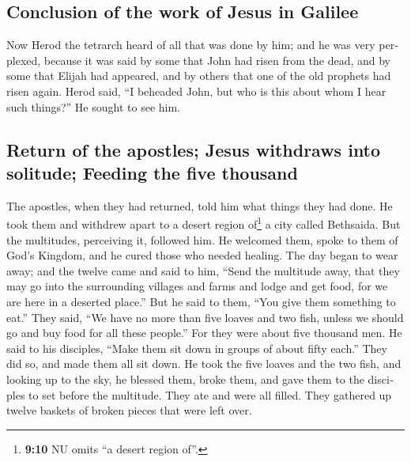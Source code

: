\begin{paracol}{2}
\begin{otherlanguage}{english}
\hypertarget{conclusion-of-the-work-of-jesus-in-galilee}{%
\subsection{Conclusion of the work of Jesus in
Galilee}\label{conclusion-of-the-work-of-jesus-in-galilee}}

 Now Herod the tetrarch heard of all that was done by him;
and he was very perplexed, because it was said by some that John had
risen from the dead,  and by some that Elijah had
appeared, and by others that one of the old prophets had risen again.
 Herod said, ``I beheaded John, but who is this about whom
I hear such things?'' He sought to see him.

\hypertarget{return-of-the-apostles-jesus-withdraws-into-solitude-feeding-the-five-thousand}{%
\subsection{Return of the apostles; Jesus withdraws into solitude;
Feeding the five
thousand}\label{return-of-the-apostles-jesus-withdraws-into-solitude-feeding-the-five-thousand}}

 The apostles, when they had returned, told him what
things they had done. He took them and withdrew apart to a desert region
of\footnote{\textbf{9:10} NU omits ``a desert region of''.} a city
called Bethsaida.  But the multitudes, perceiving it,
followed him. He welcomed them, spoke to them of God's Kingdom, and he
cured those who needed healing.  The day began to wear
away; and the twelve came and said to him, ``Send the multitude away,
that they may go into the surrounding villages and farms and lodge and
get food, for we are here in a deserted place.''  But he
said to them, ``You give them something to eat.'' They said, ``We have
no more than five loaves and two fish, unless we should go and buy food
for all these people.''  For they were about five
thousand men. He said to his disciples, ``Make them sit down in groups
of about fifty each.''  They did so, and made them all
sit down.  He took the five loaves and the two fish, and
looking up to the sky, he blessed them, broke them, and gave them to the
disciples to set before the multitude.  They ate and were
all filled. They gathered up twelve baskets of broken pieces that were
left over.

\hypertarget{peters-confession-of-the-messiah-and-the-first-announcement-of-jesus-suffering}{%
}
\end{otherlanguage}
\end{paracol}
